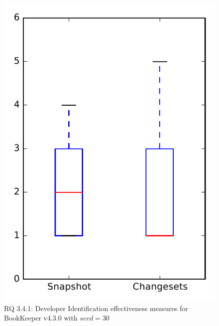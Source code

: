 
\begin{figure}
\centering
\includegraphics[height=0.4\textheight]{figures/dit_seed/rq1_bookkeeper_30}
\caption{RQ 3.4.1: Developer Identification effectiveness measures for BookKeeper v4.3.0 with $seed=30$}
\label{fig:dit_seed:rq1:bookkeeper}
\end{figure}
